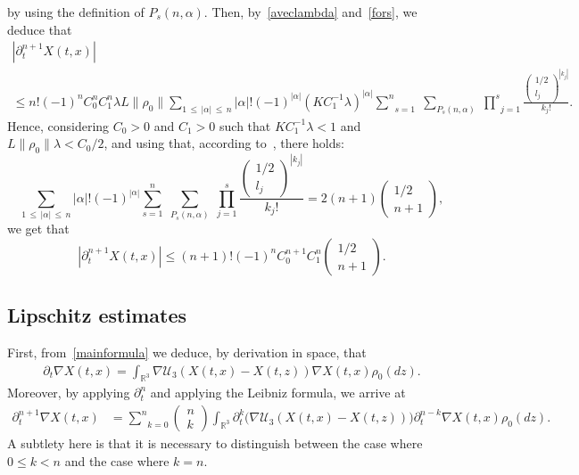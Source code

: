\documentclass[AHL,Unicode,longabstracts,published]{cedram}
\newcommand{\R}{\mathbb{R}}
\newcommand{\clU}{\mathcal{U}}
\renewcommand{\leq}{\leqslant}
\begin{document}
by using the definition of $P_s(n,\alpha)$. Then, by~\eqref{aveclambda} and~\eqref{fors}, we deduce that
\begin{multline*}
\left|\partial_t^{n+1} X(t,x)\right|
\\ \leq n!(-1)^n C_0^nC_1^n\lambda L\|\rho_0\|\underset{1\,\leq\,|\alpha|\,\leq\,n}{\sum}|\alpha|!(-1)^{|\alpha|} \left(K C_1^{-1} \lambda\right)^{|\alpha|}\underset{s=1}{\overset{n}{\sum}}\;\underset{P_s(n,\alpha)}{\sum}\;\underset{j=1}{\overset{s}{\prod}} \frac{
\begin{pmatrix}1/2\\ l_j
\end{pmatrix}^{|k_j|}}{k_j!}.
\end{multline*}
Hence, considering $C_0>0$ and $C_1>0$ such that $K C_1^{-1} \lambda<1 $ and $L\|\rho_0\|\lambda<C_0/2 $, and using that, according to~\cite[Lemma~3.3]{CVW}, there holds:
\begin{equation}\label{formule_magique1}
\underset{1\,\leq\,|\alpha|\,\leq\,n}{\sum}|\alpha|!(-1)^{|\alpha|} \underset{s=1}{\overset{n}{\sum}}\;\underset{P_s(n,\alpha)}{\sum}\;\underset{j=1}{\overset{s}{\prod}} \frac{
\begin{pmatrix}1/2\\ l_j
\end{pmatrix}^{|k_j|}}{k_j!}=2(n+1)
\begin{pmatrix}1/2\\ n+1
\end{pmatrix},
\end{equation}
we get that
\[
\left|\partial_t^{n+1} X(t,x)\right|\leq (n+1)!(-1)^n C_0^{n+1} C_1^n
\begin{pmatrix}1/2\\ n+1
\end{pmatrix}.
\]



\subsection{Lipschitz estimates}

First, from~\eqref{mainformula} we deduce, by derivation in space, that
\begin{align}\label{lip-e}
\partial_t \nabla X(t,x)= \int_{\R^3} \nabla \clU_3(X(t,x)-X(t,z))\nabla X(t,x) \rho_0(dz).
\end{align}
Moreover, by applying $\partial_t^{n}$ and applying the Leibniz formula, we arrive at
\begin{align*}
\partial_t^{n+1} \nabla X(t,x)&=\underset{k=0}{\overset{n}{\sum}}
\begin{pmatrix}n \\k
\end{pmatrix} \int_{\R^3} \partial_t^k \big(\nabla \clU_3(X(t,x)-X(t,z))\big) \partial_t^{n-k}\nabla X(t,x) \rho_0(dz).
\end{align*}
A subtlety here is that it is necessary to distinguish between the case where $0 \leq k<n$ and the case where $k=n$.
\end{document}
